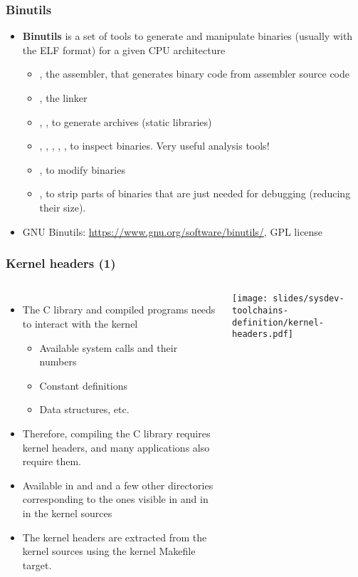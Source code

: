 \begin{frame}
  \frametitle{Binutils}
  \begin{itemize}
  \item {\bf Binutils} is a set of tools to generate and manipulate
    binaries (usually with the ELF format) for a given CPU architecture
    \begin{itemize}
    \item {}, the assembler, that generates binary code from
      assembler source code
    \item {}, the linker
    \item {}, , to generate  archives
     (static libraries)
    \item {}, , , ,
      , to inspect binaries. Very useful analysis tools!
    \item {}, to modify binaries
    \item {}, to strip parts of binaries that are just needed
      for debugging (reducing their size).
    \end{itemize}
  \item GNU Binutils: \url{https://www.gnu.org/software/binutils/}, GPL license
  \end{itemize}
\end{frame}

\begin{frame}
  \frametitle{Kernel headers (1)}
  \begin{columns}[T]
    \begin{itemize}
    \item The C library and compiled programs needs to interact with the kernel
      \begin{itemize}
      \item Available system calls and their numbers
      \item Constant definitions
      \item Data structures, etc.
      \end{itemize}
    \item Therefore, compiling the C library requires kernel headers, and many
      applications also require them.
    \item Available in  and  and a few
      other directories corresponding to the ones visible in
       and in  in the kernel sources
    \item The kernel headers are extracted from the kernel sources using
      the  kernel Makefile target.
    \end{itemize}
    \texttt{[image: slides/sysdev-toolchains-definition/kernel-headers.pdf]}
  \end{columns}
\end{frame}

